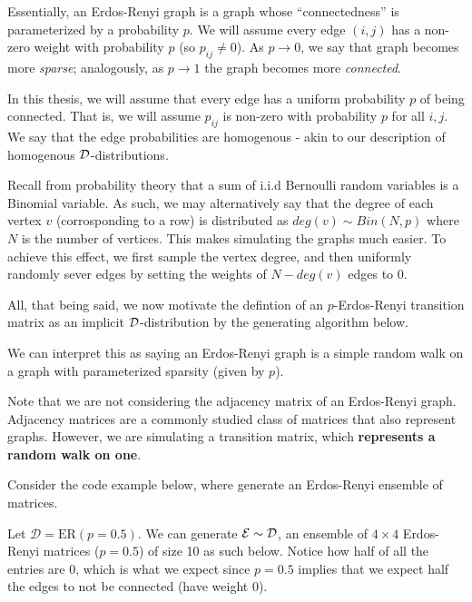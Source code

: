Essentially, an Erdos-Renyi graph is a graph whose ``connectedness'' is parameterized by a probability $p$.
We will assume every edge $(i,j)$ has a non-zero weight with probability $p$ (so $p_{ij} \neq 0$).
As $p \to 0$, we say that graph becomes more \textit{sparse}; analogously, as $p \to 1$ the graph becomes more \textit{connected}.

\begin{remark}[Homogeneity]
In this thesis, we will assume that every edge has a uniform probability $p$ of being connected.
That is, we will assume $p_{ij}$ is non-zero with probability $p$ for all $i,j$.
We say that the edge probabilities are homogenous - akin to our description of homogenous $\mathcal{D}$-distributions.
\end{remark}

Recall from probability theory that a sum of i.i.d Bernoulli random variables is a Binomial variable.
As such, we may alternatively say that the degree of each vertex $v$ (corrosponding to a row) is distributed as $deg(v) \sim Bin(N,p)$ where $N$ is the number of vertices.
This makes simulating the graphs much easier. To achieve this effect, we first sample the vertex degree, and then uniformly randomly sever edges by setting the weights of $N - deg(v)$ edges to $0$. \newline

All, that being said, we now motivate the defintion of an $p$-Erdos-Renyi transition matrix as an implicit $\mathcal{D}$-distribution by the generating algorithm below.

\ALGerdos

We can interpret this as saying an Erdos-Renyi graph is a simple random walk on a graph with parameterized sparsity (given by $p$).

\begin{warning}
Note that we are not considering the adjacency matrix of an Erdos-Renyi graph. Adjacency matrices are a commonly studied class of matrices that also represent graphs.
However, we are simulating a transition matrix, which \textbf{represents a random walk on one}.
\end{warning}

Consider the code example below, where generate an Erdos-Renyi ensemble of matrices.

\begin{code}[Erdos-Renyi p = 0.5 Ensemble]
Let $\mathcal{D} = \text{ER}(p = 0.5)$. We can generate $\mathcal{E} \sim \mathcal{D}$, an ensemble of $4 \times 4$ Erdos-Renyi matrices ($p = 0.5$) of size 10 as such below.
Notice how half of all the entries are $0$, which is what we expect since $p = 0.5$ implies that we expect half the edges to not be connected (have weight 0).
\end{code}

